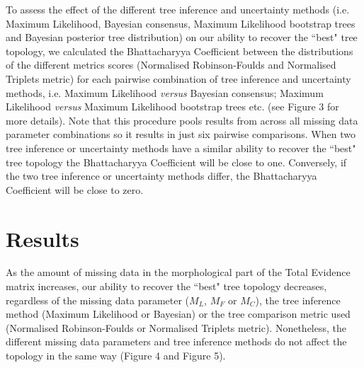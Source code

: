 \documentclass[12pt,letterpaper]{article}
\begin{document}
To assess the effect of the different tree inference and uncertainty methods (i.e. Maximum Likelihood, Bayesian consensus, Maximum Likelihood bootstrap trees and Bayesian posterior tree distribution) on our ability to recover the ``best" tree topology, we calculated the Bhattacharyya Coefficient between the distributions of the different metrics scores (Normalised Robinson-Foulds and Normalised Triplets metric) for each pairwise combination of tree inference and uncertainty methods, i.e. Maximum Likelihood \textit{versus} Bayesian consensus; Maximum Likelihood \textit{versus} Maximum Likelihood bootstrap trees etc. (see Figure 3 for more details).
Note that this procedure pools results from across all missing data parameter combinations so it results in just six pairwise comparisons.
When two tree inference or uncertainty methods have a similar ability to recover the ``best" tree topology the Bhattacharyya Coefficient will be close to one.
Conversely, if the two tree inference or uncertainty methods differ, the Bhattacharyya Coefficient will be close to zero.


%
%

\section{Results}
As the amount of missing data in the morphological part of the Total Evidence matrix increases, our ability to recover the ``best" tree topology decreases, regardless of the missing data parameter ($M_{L}$, $M_{F}$ or $M_{C}$), the tree inference method (Maximum Likelihood or Bayesian) or the tree comparison metric used (Normalised Robinson-Foulds or Normalised Triplets metric).
Nonetheless, the different missing data parameters and tree inference methods do not affect the topology in the same way (Figure 4 and Figure 5).
\end{document}
